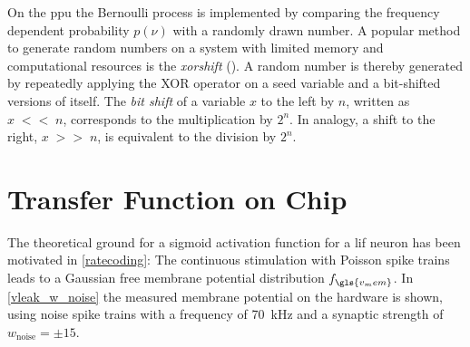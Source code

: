 On the \gls{ppu} the Bernoulli process is implemented by comparing the frequency dependent probability $p(\nu)$ with a randomly drawn number. A popular method to generate random numbers on a system with limited memory and computational resources is the \emph{xorshift} (\citealp{marsaglia2003xorshift}). A random number is thereby generated by repeatedly applying the XOR operator on a seed variable and a bit-shifted versions of itself. The \emph{bit shift} of a variable $x$ to the left by $n$, written as $x\;{\scriptstyle<<}\;n$, corresponds to the multiplication by $2^n$. In analogy, a shift to the right, $x\;{\scriptstyle>>}\;n$, is equivalent to the division by $2^n$. 



\section{Transfer Function on Chip}
The theoretical ground for a sigmoid activation function for a \gls{lif} neuron has been motivated in \cref{ratecoding}: The continuous stimulation with Poisson spike trains leads to a Gaussian free membrane potential distribution $f_{\gls{v_mem}}$. In \cref{vleak_w_noise} the measured membrane potential on the hardware is shown, using noise spike trains with a frequency of \SI{70}{\kilo \Hz} and a synaptic strength of $w_\text{noise}= \pm 15$.

